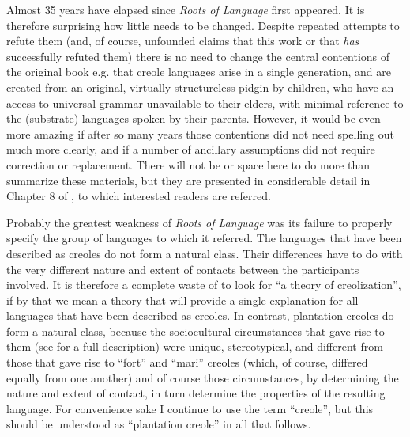 
Almost 35 years have elapsed since \textit{Roots of Language} first appeared. It is therefore surprising how little needs to be changed. Despite repeated attempts to refute them (and, of course, unfounded claims that this work or that \textit{has} successfully refuted them) there is no need to change the central contentions of the original book e.g. that creole languages arise in a single generation, and are created from an original, virtually structureless pidgin by children, who have an access to universal grammar unavailable to their elders, with minimal reference to the (substrate) languages spoken by their parents. However, it would be even more amazing if after so many years those contentions did not need spelling out much more clearly, and if a number of ancillary assumptions did not require correction or replacement. There will not be  or space here to do more than summarize these materials, but they are presented in considerable detail in Chapter 8 of \citet{Bickerton2014}, to which interested readers are referred.

Probably the greatest weakness of \textit{Roots of Language} was its failure to properly specify the group of languages to which it referred. The languages that have been described as creoles do not form a natural class. Their differences have to do with the very different nature and extent of contacts between the participants involved. It is therefore a complete waste of  to look for “a theory of creolization”, if by that we mean a theory that will provide a single explanation for all languages that have been described as creoles. In contrast, plantation creoles do form a natural class, because the sociocultural circumstances that gave rise to them (see \citealt{Bickerton2006} for a full description) were unique, stereotypical, and different from those that gave rise to “fort” and “mari” creoles (which, of course, differed equally from one another) and of course those circumstances, by determining the nature and extent of contact, in turn determine the properties of the resulting language. For convenience sake I continue to use the term “creole”, but this should be understood as “plantation creole” in all that follows.

